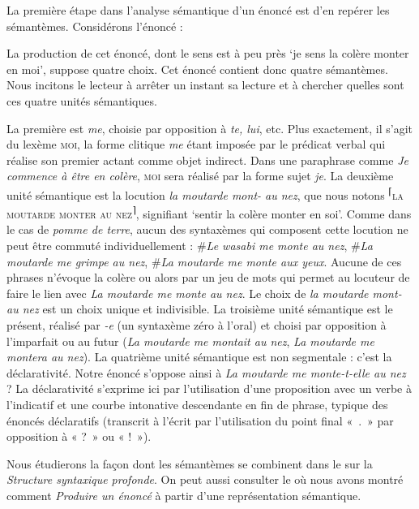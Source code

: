 La première étape dans l’analyse sémantique d’un énoncé est d’en repérer les sémantèmes. Considérons l’énoncé :

\z

La production de cet énoncé, dont le sens est à peu près ‘je sens la colère monter en moi’, suppose quatre choix. Cet énoncé contient donc quatre sémantèmes. Nous incitons le lecteur à arrêter un instant sa lecture et à chercher quelles sont ces quatre unités sémantiques.

La première est \textit{me}, choisie par opposition à \textit{te, lui}, etc. Plus exactement, il s’agit du lexème \textsc{moi}, la forme clitique \textit{me} étant imposée par le prédicat verbal qui réalise son premier actant comme objet indirect. Dans une paraphrase comme \textit{Je commence à être en colère}, \textsc{moi} sera réalisé par la forme sujet \textit{je}. La deuxième unité sémantique est la locution \textit{la moutarde mont- au nez}, que nous notons \textsuperscript{⌈}\textsc{la} \textsc{moutarde} \textsc{monter} \textsc{au} \textsc{nez}\textsuperscript{⌉}, signifiant ‘sentir la colère monter en soi’. Comme dans le cas de \textit{pomme de terre}, aucun des syntaxèmes qui composent cette locution ne peut être commuté individuellement : \#\textit{Le wasabi me monte au nez}, \#\textit{La moutarde me grimpe au nez}, \#\textit{La moutarde me monte aux yeux}. Aucune de ces phrases n’évoque la colère ou alors par un jeu de mots qui permet au locuteur de faire le lien avec \textit{La moutarde me monte au nez}. Le choix de \textit{la moutarde mont- au nez} est un choix unique et indivisible. La troisième unité sémantique est le présent, réalisé par \textit{{}-e} (un syntaxème zéro à l’oral) et choisi par opposition à l’imparfait ou au futur (\textit{La moutarde me montait au nez}, \textit{La moutarde me montera au nez}). La quatrième unité sémantique est non segmentale : c’est la déclarativité. Notre énoncé s’oppose ainsi à \textit{La moutarde me monte-t-elle au nez} ? La déclarativité s’exprime ici par l’utilisation d’une proposition avec un verbe à l’indicatif et une courbe intonative descendante en fin de phrase, typique des énoncés déclaratifs (transcrit à l’écrit par l’utilisation du point final «~.~» par opposition à « ?~» ou « !~»).

Nous étudierons la façon dont les sémantèmes se combinent dans le  sur la \textit{Structure syntaxique profonde}. On peut aussi consulter le  où nous avons montré comment \textit{Produire un énoncé} à partir d’une représentation sémantique.

